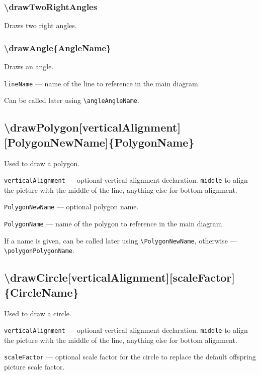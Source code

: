 \documentclass{ltxdoc}
\begin{document}
\subsubsection{\textbackslash drawTwoRightAngles}

	Draws two right angles.


\subsubsection{\textbackslash drawAngle\{AngleName\}}

	Draws an angle.

	\texttt{lineName} — name of the line to reference in the main diagram. 
	
	Can be called later using \texttt{\textbackslash angleAngleName}.
	
	
\subsection{\textbackslash drawPolygon[verticalAlignment][PolygonNewName]\{PolygonName\}}

	Used to draw a polygon.

	\texttt{verticalAlignment} — optional vertical alignment declaration. \texttt{middle} to align the picture with the middle of the line, anything else for bottom alignment.

	\texttt{PolygonNewName} — optional polygon name. 
	
	\texttt{PolygonName} — name of the polygon to reference in the main diagram. 
	
	If a name is given, can be called later using \texttt{\textbackslash PolygonNewName}, otherwise — \texttt{\textbackslash polygonPolygonName}. 
	
\subsection{\textbackslash drawCircle[verticalAlignment][scaleFactor]\{CircleName\}}

	Used to draw a circle.

	\texttt{verticalAlignment} — optional vertical alignment declaration. \texttt{middle} to align the picture with the middle of the line, anything else for bottom alignment.
	
	\texttt{scaleFactor} — optional scale factor for the circle to replace the default offspring picture scale factor. 
	
\end{document}
